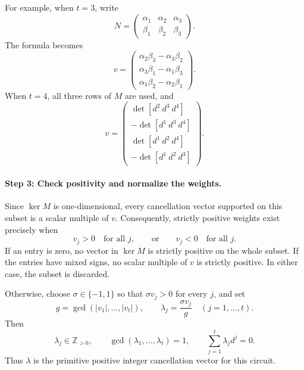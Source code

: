 \documentclass[a4paper,11pt]{amsart}
\numberwithin{equation}{section}
\theoremstyle{definition}
\theoremstyle{remark}
\begin{document}
For example, when $t=3$, write
\[
 N=
 \begin{pmatrix}
 \alpha_1&\alpha_2&\alpha_3\\
 \beta_1&\beta_2&\beta_3
 \end{pmatrix}.
\]
The formula becomes
\[
 v=
 \begin{pmatrix}
 \alpha_2\beta_3-\alpha_3\beta_2\\
 \alpha_3\beta_1-\alpha_1\beta_3\\
 \alpha_1\beta_2-\alpha_2\beta_1
 \end{pmatrix}.
\]
When $t=4$, all three rows of $M$ are used, and
\[
 v=
 \begin{pmatrix}
 \det[d^2\ d^3\ d^4]\\
 -\det[d^1\ d^3\ d^4]\\
 \det[d^1\ d^2\ d^4]\\
 -\det[d^1\ d^2\ d^3]
 \end{pmatrix}.
\]

\paragraph{Step 3: Check positivity and normalize the weights.}
Since $\ker M$ is one-dimensional, every cancellation vector supported
on this subset is a scalar multiple of $v$. Consequently, strictly
positive weights exist precisely when
\[
 v_j>0\quad\text{for all }j,
 \qquad\text{or}\qquad
 v_j<0\quad\text{for all }j.
\]
If an entry is zero, no vector in $\ker M$ is strictly positive on
the whole subset. If the entries have mixed signs, no scalar multiple
of $v$ is strictly positive. In either case, the subset is discarded.

Otherwise, choose $\sigma\in\{-1,1\}$ so that $\sigma v_j>0$ for
every $j$, and set
\[
 g=\gcd(|v_1|,\ldots,|v_t|),
 \qquad
 \lambda_j=\frac{\sigma v_j}{g}
 \quad(j=1,\ldots,t).
\]
Then
\[
 \lambda_j\in\mathbb Z_{>0},\qquad
 \gcd(\lambda_1,\ldots,\lambda_t)=1,\qquad
 \sum_{j=1}^t\lambda_jd^j=0.
\]
Thus $\lambda$ is the primitive positive integer cancellation vector
for this circuit.
\end{document}
